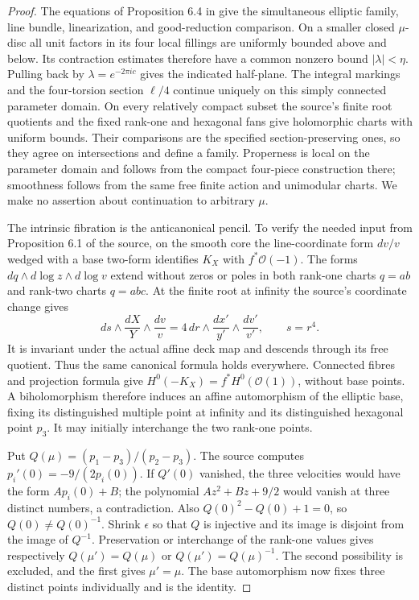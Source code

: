 \begin{proof}
The equations of Proposition 6.4 in \cite{ViaTwo26push}
give the simultaneous elliptic family, line bundle, linearization,
and good-reduction comparison.  On a smaller closed $\mu$-disc
all unit factors in its four local fillings are uniformly bounded
above and below.  Its contraction estimates therefore have a
common nonzero bound $|\lambda|<\eta$.  Pulling back by
$\lambda=e^{-2\pi i c}$ gives the indicated half-plane.
The integral markings and the four-torsion section $\ell/4$
continue uniquely on this simply connected parameter domain.
On every relatively compact subset the source's finite root
quotients and the fixed rank-one and hexagonal fans give
holomorphic charts with uniform bounds.  Their comparisons are
the specified section-preserving ones, so they agree on
intersections and define a family.  Properness is local on
the parameter domain and follows from the compact four-piece
construction there; smoothness follows from the same free
finite action and unimodular charts.  We make no assertion
about continuation to arbitrary $\mu$.

The intrinsic fibration is the anticanonical pencil.  To verify
the needed input from Proposition 6.1 of the source, on the
smooth core the line-coordinate form $dv/v$ wedged with a
base two-form identifies $K_X$ with $f^*\mathcal O(-1)$.
The forms $dq\wedge d\log z\wedge d\log v$ extend without
zeros or poles in both rank-one charts $q=ab$ and rank-two
charts $q=abc$.  At the finite root at infinity the source's
coordinate change gives
\[
 ds\wedge\frac{dX}{Y}\wedge\frac{dv}{v}
 =4\,dr\wedge\frac{dx'}{y'}\wedge\frac{dv'}{v'},
 \qquad s=r^4.
\]
It is invariant under the actual affine deck map and descends
through its free quotient.  Thus the same canonical formula
holds everywhere.  Connected fibres and projection formula
give $H^0(-K_X)=f^*H^0(\mathcal O(1))$, without base points.
A biholomorphism therefore induces an affine automorphism of
the elliptic base, fixing its distinguished multiple point
at infinity and its distinguished hexagonal point $p_3$.
It may initially interchange the two rank-one points.

Put $Q(\mu)=(p_1-p_3)/(p_2-p_3)$.
The source computes $p_i'(0)=-9/(2p_i(0))$.
If $Q'(0)$ vanished, the three velocities would have the form
$Ap_i(0)+B$; the polynomial $Az^2+Bz+9/2$ would vanish
at three distinct numbers, a contradiction.
Also $Q(0)^2-Q(0)+1=0$, so $Q(0)\ne Q(0)^{-1}$.
Shrink $\epsilon$ so that $Q$ is injective and its image
is disjoint from the image of $Q^{-1}$.  Preservation or
interchange of the rank-one values gives respectively
$Q(\mu')=Q(\mu)$ or $Q(\mu')=Q(\mu)^{-1}$.
The second possibility is excluded, and the first gives
$\mu'=\mu$.  The base automorphism now fixes three distinct
points individually and is the identity.


\end{proof}
